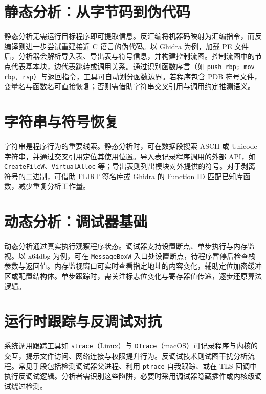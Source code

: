 \chapter{静态分析：从字节码到伪代码}
静态分析无需运行目标程序即可提取信息。反汇编将机器码映射为汇编指令，而反编译则进一步尝试重建接近 C 语言的伪代码。以 Ghidra 为例，加载 PE 文件后，分析器会解析导入表、导出表与符号信息，并构建控制流图。控制流图中的节点代表基本块，边代表跳转或调用关系。通过识别函数序言（如 \texttt{push rbp; mov rbp, rsp}）与返回指令，工具可自动划分函数边界。若程序包含 PDB 符号文件，变量名与函数名可直接恢复；否则需借助字符串交叉引用与调用约定推测语义。\par
\chapter{字符串与符号恢复}
字符串是程序行为的重要线索。静态分析时，可在数据段搜索 ASCII 或 Unicode 字符串，并通过交叉引用定位其使用位置。导入表记录程序调用的外部 API，如 \texttt{CreateFileW}、\texttt{VirtualAlloc} 等；导出表则列出模块对外提供的符号。对于剥离符号的二进制，可借助 FLIRT 签名库或 Ghidra 的 Function ID 匹配已知库函数，减少重复分析工作量。\par
\chapter{动态分析：调试器基础}
动态分析通过真实执行观察程序状态。调试器支持设置断点、单步执行与内存监视。以 x64dbg 为例，可在 \texttt{MessageBoxW} 入口处设置断点，待程序暂停后检查栈参数与返回值。内存监视窗口可实时查看指定地址的内容变化，辅助定位加密缓冲区或配置结构体。单步跟踪时，需关注标志位变化与寄存器值传递，逐步还原算法逻辑。\par
\chapter{运行时跟踪与反调试对抗}
系统调用跟踪工具如 \texttt{strace}（Linux）与 \texttt{DTrace}（macOS）可记录程序与内核的交互，揭示文件访问、网络连接与权限提升行为。反调试技术则试图干扰分析流程。常见手段包括检测调试器父进程、利用 \texttt{ptrace} 自我跟踪、或在 TLS 回调中执行反调试逻辑。分析者需识别这些陷阱，必要时采用调试器隐藏插件或内核级调试绕过检测。\par

